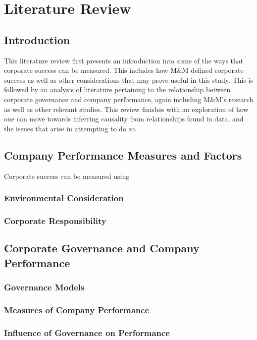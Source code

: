 %
%
%
\chapter{Literature Review}\label{C.LitReview}
\section{Introduction}\label{S.intro3}
{This literature review first presents an introduction into some of the ways that corporate success can be measured. This includes how M\&M defined corporate success as well as other considerations that may prove useful in this study. This is followed by an analysis of literature pertaining to the relationship between corporate governance and company performance, again including M\&M's research as well as other relevant studies. This review finishes with an exploration of how one can move towards inferring causality from relationships found in data, and the issues that arise in attempting to do so. }
\section{Company Performance Measures and Factors}
{Corporate success can be measured using }
\subsection{Environmental Consideration}
\subsection{Corporate Responsibility}
\section{Corporate Governance and Company Performance}
\subsection{Governance Models}
\subsection{Measures of Company Performance}
\subsection{Influence of Governance on Performance}

